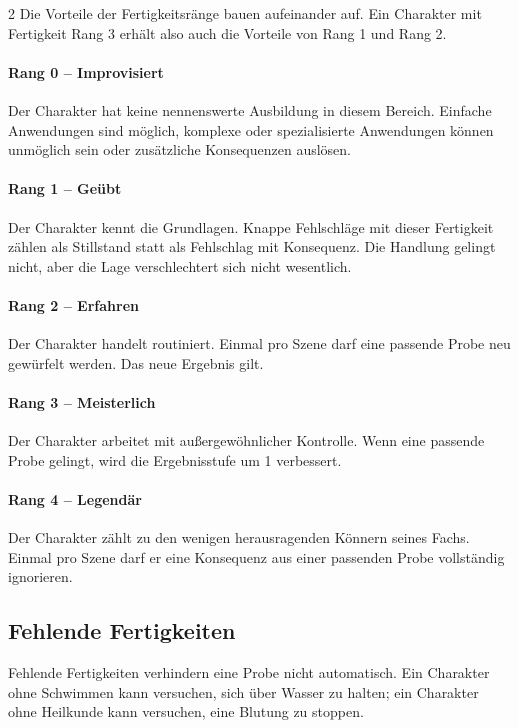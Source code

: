 \begin{multicols*}{2}
Die Vorteile der Fertigkeitsränge bauen aufeinander auf. Ein Charakter mit Fertigkeit Rang 3 erhält also auch die Vorteile von Rang 1 und Rang 2.

\paragraph{Rang 0 -- Improvisiert}
Der Charakter hat keine nennenswerte Ausbildung in diesem Bereich. Einfache Anwendungen sind möglich, komplexe oder spezialisierte Anwendungen können unmöglich sein oder zusätzliche Konsequenzen auslösen.

\paragraph{Rang 1 -- Geübt}
Der Charakter kennt die Grundlagen. Knappe Fehlschläge mit dieser Fertigkeit zählen als Stillstand statt als Fehlschlag mit Konsequenz. Die Handlung gelingt nicht, aber die Lage verschlechtert sich nicht wesentlich.

\paragraph{Rang 2 -- Erfahren}
Der Charakter handelt routiniert. Einmal pro Szene darf eine passende Probe neu gewürfelt werden. Das neue Ergebnis gilt.

\paragraph{Rang 3 -- Meisterlich}
Der Charakter arbeitet mit außergewöhnlicher Kontrolle. Wenn eine passende Probe gelingt, wird die Ergebnisstufe um 1 verbessert.

\paragraph{Rang 4 -- Legendär}
Der Charakter zählt zu den wenigen herausragenden Könnern seines Fachs. Einmal pro Szene darf er eine Konsequenz aus einer passenden Probe vollständig ignorieren.

\subsection{Fehlende Fertigkeiten}

Fehlende Fertigkeiten verhindern eine Probe nicht automatisch. Ein Charakter ohne Schwimmen kann versuchen, sich über Wasser zu halten; ein Charakter ohne Heilkunde kann versuchen, eine Blutung zu stoppen.


\end{multicols*}
